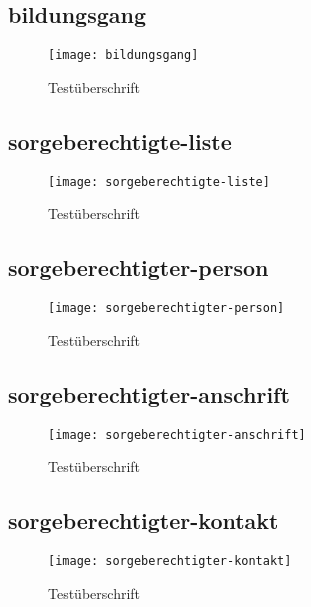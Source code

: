 \begin{landscape}
\subsection{bildungsgang}
\label{section-bildungsgang}
\begin{figure}[H]
    \centering
    \caption{Testüberschrift}
    \begin{adjustbox}{width=\linewidth, center}
        \texttt{[image: bildungsgang]}
    \end{adjustbox}
\end{figure}

\subsection{sorgeberechtigte-liste}
\label{section-sorgeberechtigte-liste}
\begin{figure}[H]
    \centering
    \caption{Testüberschrift}
    \begin{adjustbox}{width=\linewidth, center}
        \texttt{[image: sorgeberechtigte-liste]}
    \end{adjustbox}
\end{figure}

\subsection{sorgeberechtigter-person}
\label{section-sorgeberechtigter-person}
\begin{figure}[H]
    \centering
    \caption{Testüberschrift}
    \begin{adjustbox}{width=0.5\linewidth, center}
        \texttt{[image: sorgeberechtigter-person]}
    \end{adjustbox}
\end{figure}

\subsection{sorgeberechtigter-anschrift}
\label{section-sorgeberechtigter-anschrift}
\begin{figure}[H]
    \centering
    \caption{Testüberschrift}
    \begin{adjustbox}{width=0.85\linewidth, center}
        \texttt{[image: sorgeberechtigter-anschrift]}
    \end{adjustbox}
\end{figure}

\subsection{sorgeberechtigter-kontakt}
\label{section-sorgeberechtigter-kontakt}
\begin{figure}[H]
    \centering
    \caption{Testüberschrift}
    \begin{adjustbox}{width=0.6\linewidth, center}
        \texttt{[image: sorgeberechtigter-kontakt]}
    \end{adjustbox}
\end{figure}


\end{landscape}
